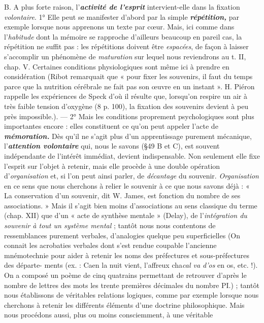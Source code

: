 B. A plus forte raison, l'\textbf{\textit {activité de l'esprit}} intervient-elle dans la
fixation {\it volontaire}. 1° Elle peut se manifester d’abord par la simple
\textbf{\textit {répétition,}} par exemple lorsque nous apprenons un texte par cœur.
Mais, ici comme dans l’{\it habitude} dont la mémoire se rapproche d’ailleurs
beaucoup en pareil cas, la répétition ne suffit pas : les répétitions
doivent être {\it espacées}, de façon à laisser s’accomplir un phénomène
de {\it maturation} sur lequel nous reviendrons au t. II, chap. V.
Certaines conditions physiologiques sont même ici à prendre en considération
{\scriptsize (Ribot remarquait que « pour fixer les souvenirs, il faut du temps parce que la
nutrition cérébrale ne fait pas son œuvre en un instant ». H. Piéron rappelle les
expériences de Speck d'où il résulte que, lorsqu'on respire un air à très faible
tension d’oxygène (8 p. 100), la fixation des souvenirs devient à peu près impossible.)}.
— 2° Mais les conditions proprement psychologiques sont
plus importantes encore : elles constituent ce qu’on peut appeler
l’acte de \textbf{\textit {mémoration.}} Dès qu’il ne s’agit plus d’un apprentissage
purement mécanique, l'\textbf{\textit {attention volontaire}} qui, nous le savons
(\S 49 B et C), est souvent indépendante de l'intérêt immédiat, devient
indispensable. Non seulement elle fixe l’esprit sur l’objet à retenir,
mais elle procède à une double opération d'{\it organisation} et, si l’on
peut ainsi parler, de {\it décantage} du souvenir. {\it Organisation} en ce sens
que nous cherchons à relier le souvenir à ce que nous savons déjà :
« La conservation d’un souvenir, dit W. James, est fonction du nombre
de ses associations. » Mais il s’agit bien moins d’associations au sens
classique du terme (chap. XII) que d’un « acte de synthèse mentale »
(Delay), de l’{\it intégration du souvenir à tout un système mental} ; tantôt
nous nous contentons de ressemblances purement verbales, d’analogies
quelque peu superficielles
{\scriptsize (On connait les acrobaties verbales dont s’est rendue coupable l’ancienne {\it }mnémotechnie
pour aider à retenir les noms des préfectures et sous-préfectures des départe-
ments (ex. : {\it }Caen la nuit vient, l’affreux cha{\it cal va d'os} en os, etc. !). On a composé un
poème de cinq quatrains permettant de retrouver d’après le nombre de lettres des mots
les trente premières décimales du nombre PI.)}
; tantôt nous établissons de véritables
relations logiques, comme par exemple lorsque nous cherchons
à retenir les différents éléments d’une doctrine philosophique. Mais
nous procédons aussi, plus ou moins consciemment, à une véritable
